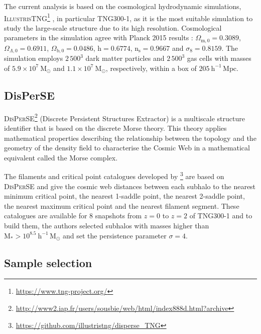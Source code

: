 \documentclass[baaa]{baaa}
\begin{document}
The current analysis is based on the cosmological hydrodynamic simulations, \textsc{IllustrisTNG}\footnote{\url{https://www.tng-project.org/}} \citep{Marinacci2018,Naiman2018,Nelson2018,Pillepich2018_a,Pillepich2018_b,Springel2018}, in particular TNG300-1, as it is the most suitable simulation to study the large-scale structure due to its high resolution.
Cosmological parameters in the simulation agree with Planck 2015 results
\citep{planckresults}: $\Omega_{\text{m},0}=0.3089$, $\Omega_{\Lambda,0}= 0.6911$, $\Omega_{\text{b},0}= 0.0486$, $\text{h}= 0.6774$, $\text{n}_{\text{s}}= 0.9667$ and $\sigma_{8}= 0.8159$.
The simulation employs $2\,500^3$ dark matter particles and $2\,500^3$ gas cells with masses of $5.9 \times 10^7~\mathrm{M}_{\odot}$ and $1.1 \times 10^7~\mathrm{M}_{\odot}$, respectively, within a box of $205~ \mathrm{h}^{-1}\,\mathrm{Mpc}$.

\subsection{DisPerSE}

\textsc{DisPerSE}\footnote{\url{http://www2.iap.fr/users/sousbie/web/html/index888d.html?archive}} (Discrete Persistent Structures Extractor) \citep{Sousbie2011_a,Sousbie2011_b,Sousbie2013} is a multiscale structure identifier that is based on the discrete Morse theory.
This theory applies mathematical properties describing the relationship between the topology and the geometry of the density field to characterise the Cosmic Web in a mathematical equivalent called the Morse complex.

The filaments and critical point catalogues developed by \cite{Duckworth2020a,Duckworth2020b} 
\footnote{\url{https://github.com/illustristng/disperse_TNG}} 
are based on \textsc{DisPerSE} and give the cosmic web distances between each subhalo to the nearest minimum critical point, the nearest 1-saddle point, the nearest 2-saddle point, the nearest maximum critical point and the nearest filament segment. 
These catalogues are available for 8 snapshots from $z=0$ to $z=2$ of TNG300-1 and to build them, the authors selected subhalos with masses higher than $\text{M}_* > 10^{8.5}~\mathrm{h^{-1}\,M}_{\odot}$ and set the persistence parameter $\sigma = 4$.


 
\subsection{Sample selection}
\end{document}
